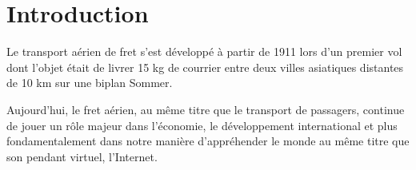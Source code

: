 
\pagebreak

\section{Introduction}

Le transport aérien de fret s'est développé à partir de 1911 lors d'un
premier vol dont l'objet était de livrer 15 kg de courrier entre deux villes asiatiques distantes de 10 km sur une biplan Sommer. 


Aujourd'hui, le fret aérien, au même titre que le transport de passagers, continue de jouer un rôle majeur dans l'économie, le développement international et plus fondamentalement dans notre manière d'appréhender le monde au même titre que son pendant virtuel, l'Internet. 


%
%
%
%   



